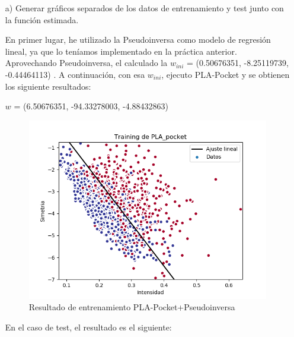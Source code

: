 \begin{itemize}
	\item[a)] Generar gráficos separados de los datos de entrenamiento y test junto con la función estimada.
	
	En primer lugar, he utilizado la Pseudoinversa como modelo de regresión lineal, ya que lo teníamos implementado en la práctica anterior. Aprovechando Pseudoinversa, el calculado la $w_{ini}$ = (0.50676351, -8.25119739, -0.44464113) . A continuación, con esa $w_{ini}$, ejecuto PLA-Pocket y se obtienen los siguiente resultados:
	
	$w$ = (6.50676351, -94.33278003, -4.88432863)
	
	\begin{figure}[H] %
		\centering
		\includegraphics[scale=0.6]{train_pla_pocket.png}  %
		\caption{Resultado de entrenamiento PLA-Pocket+Pseudoinversa} 
		\label{fig:train-pla-pocket}
	\end{figure}

	En el caso de test, el resultado es el siguiente:
	

\end{itemize}
